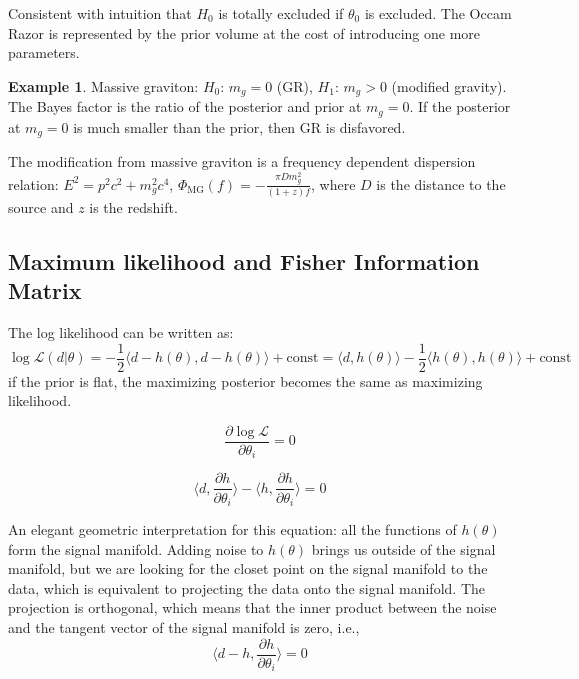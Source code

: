 \documentclass[12pt, a4paper]{article}
\newcounter{lecture}              %
\theoremstyle{plain} %
\theoremstyle{definition} %
\newtheorem{example}{Example}[lecture]
\begin{document}
Consistent with intuition that $H_0$ is totally excluded if $\theta_0$ is excluded. The Occam Razor is represented by the prior volume at the cost of introducing one more parameters.

\begin{example}
    Massive graviton: $H_0$: $m_g = 0$ (GR), $H_1$: $m_g > 0$ (modified gravity). The Bayes factor is the ratio of the posterior and prior at $m_g = 0$. If the posterior at $m_g = 0$ is much smaller than the prior, then GR is disfavored.

    The modification from massive graviton is a frequency dependent dispersion relation: $E^2 = p^2 c^2 + m_g^2 c^4$,  $\Phi_\mathrm{MG}(f) = -\frac{\pi D m_g^2}{(1+z) f}$, where $D$ is the distance to the source and $z$ is the redshift. 
\end{example}

\subsection*{Maximum likelihood and Fisher Information Matrix}
The log likelihood can be written as:
\[  \log \mathcal{L}(d|\theta) = -\frac{1}{2} \langle d - h(\theta), d - h(\theta) \rangle + \text{const} = \langle d, h(\theta) \rangle -\frac{1}{2} \langle h(\theta), h(\theta) \rangle + \text{const} \tag{3}
    \]
if the prior is flat, the maximizing posterior becomes the same as maximizing likelihood.

\begin{equation}
    \frac{\partial \log \mathcal{L}}{\partial \theta_i} = 0
\end{equation}

\begin{equation}
    \langle d, \frac{\partial h}{\partial \theta_i} \rangle - \langle h, \frac{\partial h}{\partial \theta_i} \rangle = 0
\end{equation}

An elegant geometric interpretation for this equation: all the functions of $h(\theta)$ form the signal manifold. Adding noise to $h(\theta)$ brings us outside of the signal manifold, but we are looking for the closet point on the signal manifold to the data, which is equivalent to projecting the data onto the signal manifold. The projection is orthogonal, which means that the inner product between the noise and the tangent vector of the signal manifold is zero, i.e., 
\begin{equation}
    \langle d-h, \frac{\partial h}{\partial \theta_i} \rangle = 0
\end{equation}
\end{document}
